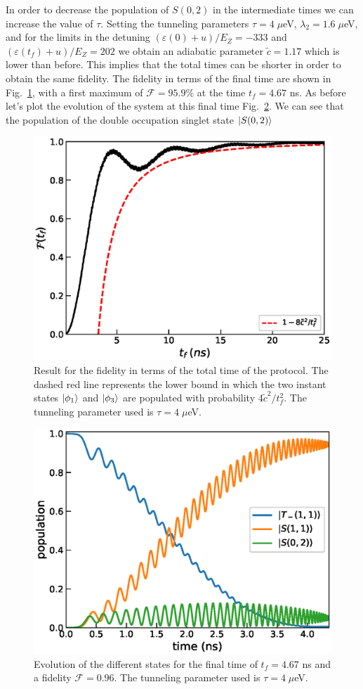 \documentclass[a4paper,11pt]{article}
\begin{document}
In order to decrease the population of $S(0,2)$ in the intermediate times we can increase the value of $\tau$. Setting the tunneling parameters $\tau=4 \; \mu$eV, $\lambda_2=1.6\;\mu$eV, and for the limits in the detuning $(\varepsilon(0)+u)/E_Z=-333$ and $(\varepsilon(t_f)+u)/E_Z=202$ we obtain an adiabatic parameter $\tilde{c}=1.17$ which is lower than before. This implies that the total times can be shorter in order to obtain the same fidelity. The fidelity in terms of the final time are shown in Fig.~\ref{fig:FAQUAD_2QD_Results_2}, with a first maximum of $\mathcal{F}=95.9\%$ at the time $t_f=4.67$ ns. As before let's plot the evolution of the system at this final time Fig.~\ref{fig:states_evolution_2}. We can see that the population of the double occupation singlet state $\ket{S(0,2)}$
\begin{figure}[!htbp]
	\centering
	\includegraphics[width=0.7\linewidth]{FAQUAD_2QD_Results_2.eps}
	\caption{Result for the fidelity in terms of the total time of the protocol. The dashed red line represents the lower bound in which the two instant states $\ket{\phi_1}$ and $\ket{\phi_3}$ are populated with probability $4\tilde{c}^2/t_f^2$. The tunneling parameter used is $\tau=4\; \mu$eV.}
	\label{fig:FAQUAD_2QD_Results_2}
\end{figure}
\begin{figure}[!htbp]
	\centering
	\includegraphics[width=0.7\linewidth]{states_evolution_2.eps}
	\caption{Evolution of the different states for the final time of $t_f=4.67$ ns and a fidelity $\mathcal{F}=0.96$. The tunneling parameter used is $\tau=4\; \mu$eV.}
	\label{fig:states_evolution_2}
\end{figure}\\
\end{document}
